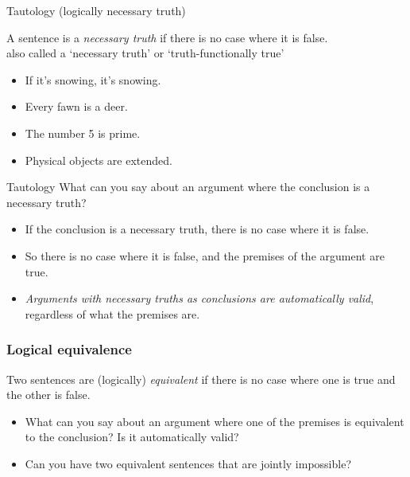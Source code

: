 \begin{frame}{Tautology (logically necessary truth)}

  \begin{definition}
    A sentence is a \emph{necessary truth} if there is no case where
    it is false. \\ also called a `necessary truth' or `truth-functionally true'
    \end{definition}
\pause
    \begin{itemize}[<+->]
      \item If it's snowing, it's snowing.
      \item Every fawn is a deer.
      \item The number 5 is prime.
      \item Physical objects are extended.
    \end{itemize}
\end{frame}

\begin{frame}{Tautology}
    What can you say about an argument where the conclusion is a
    necessary truth? 
\pause
\begin{itemize}[<+->]
  \item If the conclusion is a necessary truth, there is no case where
  it is false.
  \item So there is no case where it is false, and the premises of the
  argument are true.
  \item \emph{Arguments with necessary truths as conclusions are
  automatically valid}, regardless of what the premises are.
\end{itemize}
  \end{frame}

\begin{frame}
  \frametitle{Logical equivalence}

  \begin{definition}
  Two sentences are (logically) \emph{equivalent} if there is no case where one is
  true and the other is false.
  \end{definition}

  \begin{itemize}[<+->]
    \item What can you say about an argument where one of the premises
    is equivalent to the conclusion? Is it automatically valid?
    \item Can you have two equivalent sentences that are jointly impossible?
  \end{itemize}

\end{frame}

